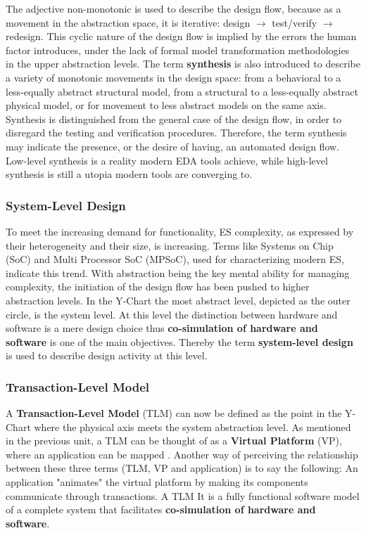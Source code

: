 \documentclass[11pt]{article}
\begin{document}
The adjective non-monotonic is used to describe the design flow, because as a movement in the abstraction space, it is iterative:
design \(\rightarrow\) test/verify \(\rightarrow\) redesign.
This cyclic nature of the design flow is implied by the errors the human factor introduces, under the lack of formal model transformation methodologies in the upper abstraction levels.
The term \textbf{synthesis} is also introduced to describe a variety of monotonic movements in the design space: from a behavioral to a less-equally abstract structural model, from a structural to a less-equally abstract physical model, or for movement to less abstract models on the same axis.
Synthesis is distinguished from the general case of the design flow, in order to disregard the testing and verification procedures.
Therefore, the term synthesis may indicate the presence, or the desire of having, an automated design flow.
Low-level synthesis is a reality modern EDA tools achieve, while high-level synthesis is still a utopia modern tools are converging to.





\subsubsection{System-Level Design}
\label{sec:org9c35885}
To meet the increasing demand for functionality, ES complexity, as expressed by their heterogeneity and their size, is increasing.
Terms like Systems on Chip (SoC) and Multi Processor SoC (MPSoC), used for characterizing modern ES, indicate this trend.
With abstraction being the key mental ability for managing complexity, the initiation of the design flow has been pushed to higher abstraction levels.
In the Y-Chart the most abstract level, depicted as the outer circle, is the system level.
At this level the distinction between hardware and software is a mere design choice thus \textbf{co-simulation of hardware and software} is one of the main objectives.
Thereby the term \textbf{system-level design} is used to describe design activity at this level.



\subsubsection{Transaction-Level Model}
\label{sec:orgce17811}
A \textbf{Transaction-Level Model} (TLM) can now be defined as the point in the Y-Chart where the physical axis meets the system abstraction level.
As mentioned in the previous unit, a TLM can be thought of as a \textbf{Virtual Platform} (VP), where an application can be mapped \cite{Rigo2011}.
Another way of perceiving the relationship between these three terms (TLM, VP and application) is to say the following:
An application "animates" the virtual platform by making its components communicate through transactions.
A TLM It is a fully functional software model of a complete system that facilitates \textbf{co-simulation of hardware and software}.
\end{document}
